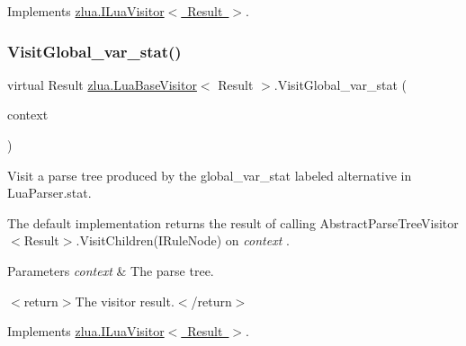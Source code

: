 Implements \mbox{\hyperlink{interfacezlua_1_1_i_lua_visitor_a866d0dc7a283123ec21f9f279f7f647a}{zlua.\+I\+Lua\+Visitor$<$ Result $>$}}.

\mbox{\label{classzlua_1_1_lua_base_visitor_a0801068996633dcc16867ec54b05a314}} 
\subsubsection{\texorpdfstring{Visit\+Global\+\_\+var\+\_\+stat()}{VisitGlobal\_var\_stat()}}
{\footnotesize\ttfamily virtual Result \mbox{\hyperlink{classzlua_1_1_lua_base_visitor}{zlua.\+Lua\+Base\+Visitor}}$<$ Result $>$.Visit\+Global\+\_\+var\+\_\+stat (\begin{DoxyParamCaption}\item[{\mbox{[}\+Not\+Null\mbox{]} \mbox{\hyperlink{classzlua_1_1_lua_parser_1_1_global__var__stat_context}{Lua\+Parser.\+Global\+\_\+var\+\_\+stat\+Context}}}]{context }\end{DoxyParamCaption})\hspace{0.3cm}{\ttfamily [virtual]}}



Visit a parse tree produced by the {\ttfamily global\+\_\+var\+\_\+stat} labeled alternative in Lua\+Parser.\+stat. 

The default implementation returns the result of calling Abstract\+Parse\+Tree\+Visitor$<$\+Result$>$.\+Visit\+Children(\+I\+Rule\+Node) on {\itshape context} . 


\begin{DoxyParams}{Parameters}
{\em context} & The parse tree.\\
\hline
\end{DoxyParams}
$<$return$>$The visitor result.$<$/return$>$ 

Implements \mbox{\hyperlink{interfacezlua_1_1_i_lua_visitor_a6a56d5d3378a075a2ac40720cf317954}{zlua.\+I\+Lua\+Visitor$<$ Result $>$}}.

\mbox{\label{classzlua_1_1_lua_base_visitor_a1e7d3f1f74effce653280aaffa193128}} 
